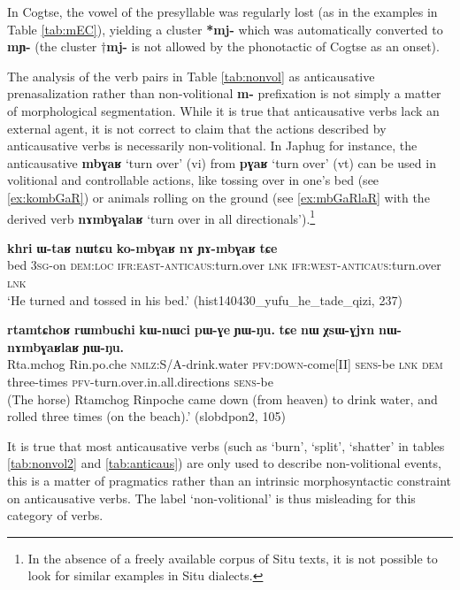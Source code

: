 \documentclass[oneside,a4paper,11pt]{article}
\newcommand{\ipa}[1]{\textbf{{\phon\mbox{#1}}}} %
\begin{document}
In Cogtse, the vowel of the presyllable was regularly lost (as in the examples in Table \ref{tab:mEC}), yielding a cluster \ipa{*mj-} which was automatically converted to \ipa{mɲ-} (the cluster $\dagger$\ipa{mj-} is not allowed by the phonotactic of Cogtse as an onset).

The analysis of the verb pairs in Table \ref{tab:nonvol} as anticausative prenasalization rather than non-volitional \ipa{m-} prefixation is not simply a matter of morphological segmentation. While it is true that anticausative verbs lack an external agent, it is not correct to claim that the actions described by anticausative verbs is necessarily non-volitional. In Japhug for instance, the anticausative \ipa{mbɣaʁ} `turn over' (vi) from \ipa{pɣaʁ} `turn over' (vt) can be used in volitional and controllable actions, like tossing over in one's bed (see \ref{ex:kombGaR}) or animals rolling on the ground (see \ref{ex:mbGaRlaR} with  the derived verb \ipa{nɤmbɣalaʁ} `turn over in all directionals').\footnote{In the absence of a freely available corpus of Situ texts, it is not possible to look for similar examples in Situ dialects.}

 \begin{exe}
\ex \label{ex:kombGaR}
\gll \ipa{khri} 	\ipa{ɯ-taʁ} 	\ipa{nɯtɕu} 	\ipa{ko-mbɣaʁ} 	\ipa{nɤ} 	\ipa{ɲɤ-mbɣaʁ} 	\ipa{tɕe}  \\
bed \textsc{3sg}-on \textsc{dem:loc} \textsc{ifr:east-anticaus}:turn.over \textsc{lnk} \textsc{ifr:west-anticaus}:turn.over \textsc{lnk} \\
\glt `He turned and tossed in his bed.' (hist140430_yufu_he_tade_qizi, 237)
\end{exe}

 \begin{exe}
\ex \label{ex:mbGaRlaR}
\gll \ipa{rtamtɕhoʁ} 	\ipa{rɯmbuɕhi} 	\ipa{kɯ-nɯci} 	\ipa{pɯ-ɣe} 	\ipa{ɲɯ-ŋu.} \ipa{tɕe} 	\ipa{nɯ} 	\ipa{χsɯ-ɣjɤn} 	\ipa{nɯ-nɤmbɣaʁlaʁ} 	\ipa{ɲɯ-ŋu.}  \\
 Rta.mchog Rin.po.che \textsc{nmlz}:S/A-drink.water \textsc{pfv:down}-come[II]  \textsc{sens}-be \textsc{lnk} \textsc{dem} three-times \textsc{pfv}-turn.over.in.all.directions  \textsc{sens}-be \\
\glt  (The horse) Rtamchog Rinpoche came down (from heaven) to drink water, and rolled three times (on the beach).' (slobdpon2, 105)
 \end{exe}

It is true that most anticausative verbs (such as `burn', `split', `shatter' in tables \ref{tab:nonvol2} and \ref{tab:anticaus}) are only used to describe non-volitional events, this is a matter of pragmatics rather than an intrinsic morphosyntactic constraint on anticausative verbs. The label `non-volitional' is thus misleading for this category of verbs.
\end{document}
